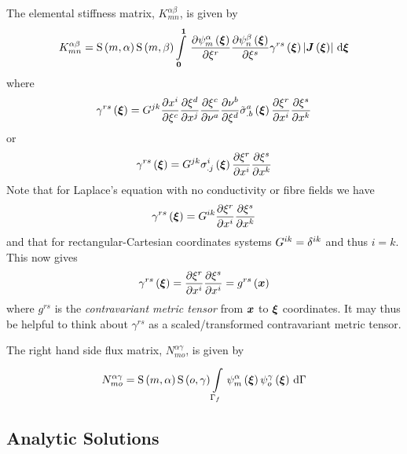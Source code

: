 The elemental stiffness matrix, $K^{\alpha\beta}_{mn}$, is given by
\begin{equation}
  K^{\alpha\beta}_{mn}=\gsf{m}{\alpha}\gsf{m}{\beta}
  \gint{\vectr{0}}{\vectr{1}}{\delby{\gbfn{m}{\alpha}{\vectr{\xi}}}{\xi^{r}}
    \delby{\gbfn{n}{\beta}{\vectr{\xi}}}{\xi^{s}}\fnof{\gamma^{rs}}{\vectr{\xi}}
    \abs{\fnof{\matr{J}}{\vectr{\xi}}}}{\vectr{\xi}}
  \label{eqn:elementalfemlhs2}
\end{equation}
where
\begin{equation}
  \fnof{\gamma^{rs}}{\vectr{\xi}}=G^{jk}\delby{x^{i}}{\xi^{c}}
  \delby{\xi^{d}}{x^{j}}\delby{\xi^{c}}{\nu^{a}}\delby{\nu^{b}}{\xi^{d}}
  \fnof{{\tilde{\sigma}}^{a}_{.b}}{\vectr{\xi}}\delby{\xi^{r}}{x^{i}}\delby{\xi^{s}}{x^{k}}
  \label{eqn:diffusiongammadefinition1}
\end{equation}
or
\begin{equation}
   \gamma^{rs}\left(  \boldsymbol{\xi}  \right) =G^{jk} {\sigma}^{i}_{.j}\left(  \boldsymbol{\xi}  \right)  \dfrac{\partial \xi^{r}}{\partial x^{i}}  \dfrac{\partial \xi^{s}}{\partial x^{k}} 
\end{equation}
Note that for Laplace's equation with no conductivity or fibre fields we have
\begin{equation}
  \fnof{\gamma^{rs}}{\vectr{\xi}}=G^{ik}\delby{\xi^{r}}{x^{i}}\delby{\xi^{s}}{x^{k}}
  \label{eqn:diffusiongammadefinition2}
\end{equation}
and that for rectangular-Cartesian coordinates systems
$G^{ik}=  \delta^{{i}{k}}  $ and thus $i=k$. This now gives
\begin{equation}
  \fnof{\gamma^{rs}}{\vectr{\xi}}=\delby{\xi^{r}}{x^{i}}\delby{\xi^{s}}{x^{i}}=\fnof{g^{rs}}{\vectr{x}}
  \label{eqn:diffusiongammadefinition3}
\end{equation}
where $g^{rs}$ is the \emph{contravariant metric tensor} from $ \boldsymbol{x} $ to
$ \boldsymbol{\xi} $ coordinates. It may thus be helpful to think about $\gamma^{rs}$
as a scaled/transformed contravariant metric tensor.

The right hand side flux matrix, $N^{\alpha\gamma}_{mo}$, is given by
\begin{equation}
  N^{\alpha\gamma}_{mo} = \gsf{m}{\alpha}\gsf{o}{\gamma}
  \gint{\Gamma_{f}}{}{\gbfn{m}{\alpha}{\vectr{\xi}}\gbfn{o}{\gamma}{\vectr{\xi}}}{\Gamma}
\end{equation}

\subsection{Analytic Solutions}
 
